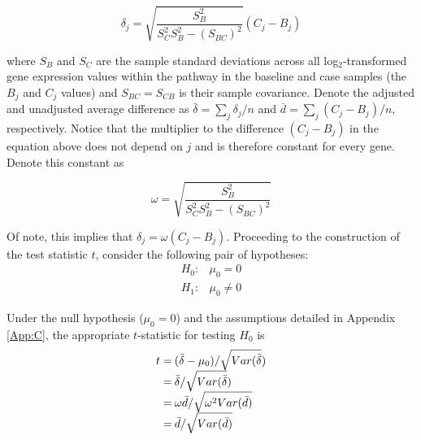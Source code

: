 \begin{equation*}
\label{eq:MD}
\delta_{j} = \sqrt{\frac{S^{2}_{B}}{S^{2}_{C}S^{2}_{B}-(S_{BC})^{2}}}(C_{j} - B_{j}) 
\end{equation*}

\noindent where $S_{B}$ and $S_{C}$ are the sample standard deviations across all log$_{2}$-transformed gene expression values within the pathway in the baseline and case samples (the $B_{j}$ and $C_{j}$ values) and $S_{BC}=S_{CB}$ is their sample covariance. Denote the adjusted and unadjusted average difference as $\bar{\delta} = \sum_j \delta_j/n$ and $\bar{d} = \sum_j (C_{j} - B_{j})/n$, respectively. Notice that the multiplier to the difference $(C_{j} - B_{j})$ in the equation above does not depend on $j$ and is therefore constant for every gene. Denote this constant as

\begin{equation*}
\label{eq:coef}
\omega = \sqrt{\frac{S^{2}_{B}}{S^{2}_{C}S^{2}_{B}-(S_{BC})^{2}}}
\end{equation*}

\noindent Of note, this implies that $\delta_j = \omega(C_j - B_j)$. Proceeding to the construction of the test statistic $t$, consider the following pair of hypotheses:
\begin{equation*}
  \label{eq:hypotheses}
\begin{array}{rl}
  H_{0}: & \mu_{0} = 0 \\
  H_{1}: & \mu_{0} \neq 0
\end{array}
\end{equation*}

\noindent Under the null hypothesis ($\mu_{0}=0$) and the assumptions detailed in Appendix \ref{App:C}, the appropriate $t$-statistic for testing $H_{0}$ is 
\begin{equation*}
  \label{eq:t}
  \arraycolsep=1.1pt\def\arraystretch{1.4}
\begin{array}{rl}
  t = & (\bar{\delta} - \mu_{0})/ \sqrt{Var(\bar{\delta}}) \\
  = & \bar{\delta}/ \sqrt{Var(\bar{\delta}}) \\
  = & \omega \bar{d}/ \sqrt{\omega^{2} Var(\bar{d})} \\
  = & \bar{d}/ \sqrt{ Var(\bar{d})} \\
\end{array}
\end{equation*}

